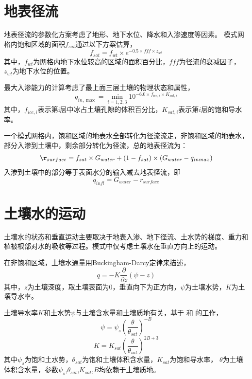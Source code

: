 \section{地表径流}
地表径流的参数化方案考虑了地形、地下水位、降水和入渗速度等因素。
模式网格内饱和区域的面积$f_{sat}$通过以下方案估算，
\begin{equation}
f_{sat}=f_{w t} \times e^{-0.5 \times fff \times z_{wt}}
\end{equation}
其中，$f_{wt}$为网格内地下水位较高的区域的面积百分比，$fff$为径流的衰减因子，$z_{wt}$为地下水位的位置。

最大入渗能力的计算考虑了最上面三层土壤的物理状态和属性，
\begin{equation}
q_{i n, \max }=\min _{i=1,2,3} 10^{-6.0 \times f_{i c e, i} \times K_{sat, i}}
\end{equation}
其中，$f_{ice,i}$表示第i层中冰占土壤孔隙的体积百分比，$K_{sat,i}$表示第$i$层的饱和导水率。

一个模式网格内，饱和区域的地表水全部转化为径流流走，非饱和区域的地表水，部分入渗到土壤中，剩余部分转化为径流，总的地表径流为：
\begin{equation}
\r_{surface }=f_{sat} \times G_{water}+\left(1-f_{sat}\right) \times \left(G_{water}-q_{inmax}\right)
\end{equation}
入渗到土壤中的部分等于表面水分的输入减去地表径流，即
\begin{equation}
q_{infl}={G}_{water}-r_{surface}
\end{equation}


\section{土壤水的运动}\label{sec:土壤水的运动}
土壤水的状态和垂直运动主要取决于地表入渗、地下径流、土水势的梯度、重力和植被根部对水的吸收等过程。模式中仅考虑土壤水在垂直方向上的运动。


在非饱和区域，土壤水通量用Buckingham-Darcy定律来描述，
\begin{equation}
q=-K \frac{\partial}{\partial z}(\psi-z)
\end{equation}
其中，$z$为土壤深度，取土壤表面为0，垂直向下为正方向，$\psi$为土壤水势，$K$为土壤导水率。


土壤导水率$K$和土水势$\psi$与土壤含水量和土壤质地有关，基于 \citet{clapp1978empirical} 和 \citet{cosby1984statistical} 的工作，
\begin{equation}
\psi=\psi_{s}\left(\frac{\theta}{\theta_{sat}}\right)^{-B}
\end{equation}
\begin{equation}
K=K_{sat}\left(\frac{\theta}{\theta_{sat}}\right)^{2 B+3}
\end{equation}
其中$\psi_s$为饱和土水势，$\theta_{sat}$为饱和土壤体积含水量，$K_{sat}$为饱和导水率，
$\theta$为土壤体积含水量，参数$\psi_s$,$\theta_{sat}$,$K_{sat}$,$B$均依赖于土壤质地。



